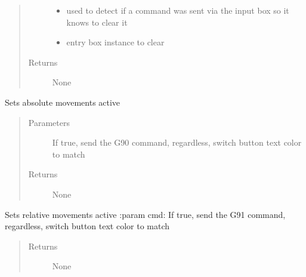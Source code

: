 \documentclass[letterpaper,10pt,english]{sphinxmanual}
\begin{document}
\begin{fulllineitems}
\begin{fulllineitems}
\begin{quote}
\begin{description}
\begin{itemize}
\item {} 
\sphinxAtStartPar
{} \textendash{} used to detect if a command was sent via the input box so it knows to clear it

\item {} 
\sphinxAtStartPar
{} \textendash{} entry box instance to clear

\end{itemize}

\item[{Returns}] \leavevmode
\sphinxAtStartPar
None

\end{description}\end{quote}

\end{fulllineitems}


\begin{fulllineitems}
\label{\detokenize{index:droogCNC.TwoAxisStage.setG90}}
\sphinxAtStartPar
Sets absolute movements active
\begin{quote}\begin{description}
\item[{Parameters}] \leavevmode
\sphinxAtStartPar
{} \textendash{} If true, send the G90 command, regardless, switch button text color to match

\item[{Returns}] \leavevmode
\sphinxAtStartPar
None

\end{description}\end{quote}

\end{fulllineitems}


\begin{fulllineitems}
\label{\detokenize{index:droogCNC.TwoAxisStage.setG91}}
\sphinxAtStartPar
Sets relative movements active
:param cmd: If true, send the G91 command, regardless, switch button text color to match
\begin{quote}\begin{description}
\item[{Returns}] \leavevmode
\sphinxAtStartPar
None


\end{description}
\end{quote}
\end{fulllineitems}
\end{fulllineitems}
\end{document}
